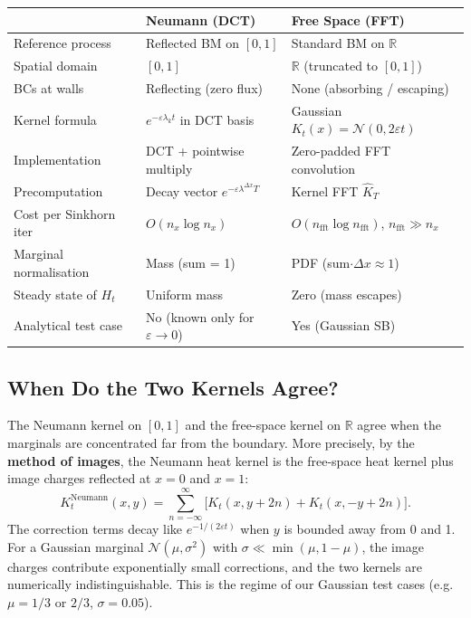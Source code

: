 \documentclass[11pt]{article}
\newcommand{\eps}{\varepsilon}
\newcommand{\dx}{\Delta x}
\newcommand{\RR}{\mathbb{R}}
\theoremstyle{remark}
\begin{document}
\begin{center}
\renewcommand{\arraystretch}{1.4}
\begin{tabular}{lll}
\toprule
                        & \textbf{Neumann (DCT)}     & \textbf{Free Space (FFT)} \\
\midrule
Reference process       & Reflected BM on $[0,1]$    & Standard BM on $\RR$      \\
Spatial domain          & $[0,1]$                    & $\RR$ (truncated to $[0,1]$) \\
BCs at walls            & Reflecting (zero flux)     & None (absorbing / escaping) \\
Kernel formula          & $e^{-\eps\lambda_k t}$ in DCT basis & Gaussian $K_t(x) = \mathcal{N}(0, 2\eps t)$ \\
Implementation          & DCT + pointwise multiply   & Zero-padded FFT convolution \\
Precomputation          & Decay vector $e^{-\eps\lambda^{\dx} T}$ & Kernel FFT $\hat K_T$ \\
Cost per Sinkhorn iter  & $O(n_x \log n_x)$          & $O(n_{\mathrm{fft}} \log n_{\mathrm{fft}})$, $n_{\mathrm{fft}} \gg n_x$ \\
Marginal normalisation  & Mass (sum = 1)             & PDF (sum$\cdot\dx \approx 1$) \\
Steady state of $H_t$   & Uniform mass               & Zero (mass escapes) \\
Analytical test case    & No (known only for $\eps \to 0$) & Yes (Gaussian SB) \\
\bottomrule
\end{tabular}
\end{center}

\subsection{When Do the Two Kernels Agree?}

The Neumann kernel on $[0,1]$ and the free-space kernel on $\RR$ agree when the
marginals are concentrated far from the boundary.
More precisely, by the \textbf{method of images}, the Neumann heat kernel is the
free-space heat kernel plus image charges reflected at $x = 0$ and $x = 1$:
\begin{equation}
  K_t^{\mathrm{Neumann}}(x, y)
  = \sum_{n=-\infty}^{\infty}
    \bigl[ K_t(x, y + 2n) + K_t(x, -y + 2n) \bigr].
\end{equation}
The correction terms decay like $e^{-1/(2\eps t)}$ when $y$ is bounded away from 0 and 1.
For a Gaussian marginal $\mathcal{N}(\mu, \sigma^2)$ with $\sigma \ll \min(\mu, 1-\mu)$,
the image charges contribute exponentially small corrections, and the two kernels are
numerically indistinguishable.
This is the regime of our Gaussian test cases (e.g.\ $\mu = 1/3$ or $2/3$, $\sigma = 0.05$).
\end{document}
